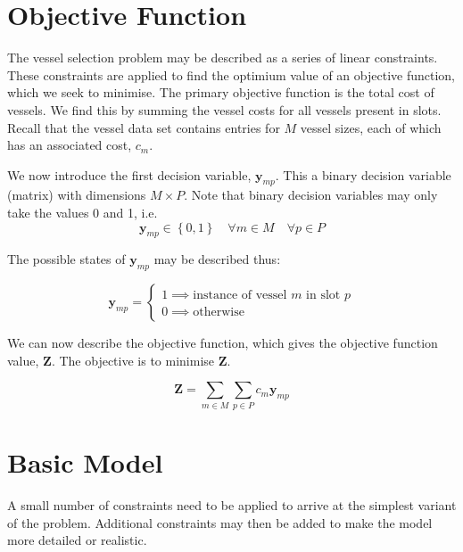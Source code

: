 \section{Objective Function}\label{S.objfn}

The vessel selection problem may be described as a series of linear constraints.
These constraints are applied to find the optimium value of an objective
function, which we seek to minimise.
The primary objective function is the total cost of vessels.
We find this by summing the vessel costs for all vessels present in slots.
Recall that the vessel data set contains entries for $M$ vessel sizes, each
of which has an associated cost, $c_{m}$.

We now introduce the first decision variable, $\boldsymbol{y}_{mp}$.
This a binary decision variable (matrix) with dimensions $M \times P$.
Note that binary decision variables may only take the values 0 and 1, i.e.
\begin{equation}
    \boldsymbol{y}_{mp} \in \left\{ 0, 1 \right\} \quad \forall m \in M \quad
    \forall p \in P
    \label{eq.y}
\end{equation}

The possible states of $\boldsymbol{y}_{mp}$ may be described thus:

\begin{equation}
    \boldsymbol{y}_{mp} =
    \begin{cases}
        1 \implies \text{instance of vessel $m$ in slot $p$}\\
        0 \implies \text{otherwise}
    \end{cases}
\end{equation}

We can now describe the objective function, which gives the objective function
value, $\boldsymbol{Z}$.  The objective is to minimise $\boldsymbol{Z}$.

\begin{equation}
    \boldsymbol{Z} = \sum_{m \in M} \sum_{p \in P} c_m \boldsymbol{y}_{mp}
    \label{eq.objfn}
\end{equation} 

\section{Basic Model}\label{S.basicprob}

A small number of constraints need to be applied to arrive at the simplest 
variant of the problem.
Additional constraints may then be added to make the model more detailed or
realistic.

